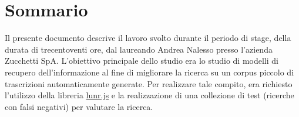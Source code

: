 
\cleardoublepage
{}
{}
\begingroup
\let\clearpage\relax
\let\cleardoublepage\relax
\let\cleardoublepage\relax

\chapter*{Sommario}

Il presente documento descrive il lavoro svolto durante il periodo di stage, della durata di trecentoventi ore, dal laureando Andrea Nalesso presso l'azienda Zucchetti SpA.
L'obiettivo principale dello studio era lo studio di modelli di recupero dell'informazione al fine di migliorare la ricerca su un corpus piccolo di trascrizioni automaticamente generate. 
Per realizzare tale compito, era richiesto l'utilizzo della libreria \href{https://lunrjs.com/}{lunr.js} e la realizzazione di una collezione di test (ricerche con falsi negativi) per valutare la ricerca.
%
%

\endgroup			

\vfill

